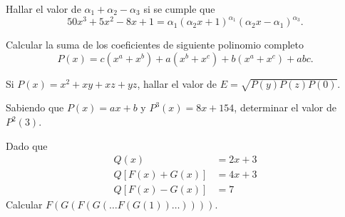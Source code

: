 \begin{multicols}{2}
    \begin{problem}
        Hallar el valor de $\alpha_1 + \alpha_2 - \alpha_3$ si se cumple que
        \[
            50x^3 + 5x^2 - 8x + 1 = \alpha_1 (\alpha_2 x + 1)^{\alpha_1} (\alpha_2 x - \alpha_1)^{\alpha_3}.
        \]
    \end{problem}

    \begin{problem}
        Calcular la suma de los coeficientes de siguiente polinomio completo
        \[
            P(x) = c(x^a + x^b) + a(x^b + x^c) + b(x^a + x^c) + abc.
        \]
    \end{problem}

    \begin{problem}
        Si $P(x) = x^2 + xy + xz + yz$, hallar el valor de $E = \sqrt {P(y)P(z)P(0)}$.
    \end{problem}

    \begin{problem}
        Sabiendo que $P(x) = ax + b$ y $P^3(x) = 8x + 154$, determinar el valor de $P^2(3)$.
    \end{problem}

    \begin{problem}
        Dado que
        \begin{align*}
            Q(x) &= 2x + 3 \\
            Q\left[ F(x) + G(x) \right] &= 4x + 3 \\
            Q\left[ F(x) - G(x) \right] &= 7
        \end{align*}
        Calcular $F(G(F(G(\dots F(G(1))\dots))))$.
    \end{problem}
\end{multicols}